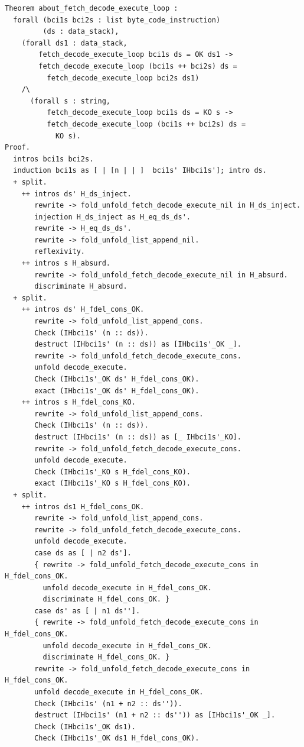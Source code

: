 \documentclass{article}
\begin{document}
\begin{lstlisting}
Theorem about_fetch_decode_execute_loop :
  forall (bci1s bci2s : list byte_code_instruction)
         (ds : data_stack),
    (forall ds1 : data_stack,
        fetch_decode_execute_loop bci1s ds = OK ds1 ->
        fetch_decode_execute_loop (bci1s ++ bci2s) ds =
          fetch_decode_execute_loop bci2s ds1)
    /\
      (forall s : string,
          fetch_decode_execute_loop bci1s ds = KO s ->
          fetch_decode_execute_loop (bci1s ++ bci2s) ds =
            KO s).
Proof.
  intros bci1s bci2s.
  induction bci1s as [ | [n | | ]  bci1s' IHbci1s']; intro ds.
  + split.
    ++ intros ds' H_ds_inject.
       rewrite -> fold_unfold_fetch_decode_execute_nil in H_ds_inject.
       injection H_ds_inject as H_eq_ds_ds'.
       rewrite -> H_eq_ds_ds'.
       rewrite -> fold_unfold_list_append_nil.
       reflexivity.
    ++ intros s H_absurd.
       rewrite -> fold_unfold_fetch_decode_execute_nil in H_absurd.
       discriminate H_absurd.
  + split.
    ++ intros ds' H_fdel_cons_OK.
       rewrite -> fold_unfold_list_append_cons.
       Check (IHbci1s' (n :: ds)).
       destruct (IHbci1s' (n :: ds)) as [IHbci1s'_OK _].
       rewrite -> fold_unfold_fetch_decode_execute_cons.
       unfold decode_execute.
       Check (IHbci1s'_OK ds' H_fdel_cons_OK).
       exact (IHbci1s'_OK ds' H_fdel_cons_OK).
    ++ intros s H_fdel_cons_KO.
       rewrite -> fold_unfold_list_append_cons.
       Check (IHbci1s' (n :: ds)).
       destruct (IHbci1s' (n :: ds)) as [_ IHbci1s'_KO].
       rewrite -> fold_unfold_fetch_decode_execute_cons.
       unfold decode_execute.
       Check (IHbci1s'_KO s H_fdel_cons_KO).
       exact (IHbci1s'_KO s H_fdel_cons_KO).
  + split.
    ++ intros ds1 H_fdel_cons_OK.
       rewrite -> fold_unfold_list_append_cons.
       rewrite -> fold_unfold_fetch_decode_execute_cons.
       unfold decode_execute.
       case ds as [ | n2 ds'].
       { rewrite -> fold_unfold_fetch_decode_execute_cons in H_fdel_cons_OK.
         unfold decode_execute in H_fdel_cons_OK.
         discriminate H_fdel_cons_OK. }
       case ds' as [ | n1 ds''].
       { rewrite -> fold_unfold_fetch_decode_execute_cons in H_fdel_cons_OK.
         unfold decode_execute in H_fdel_cons_OK.
         discriminate H_fdel_cons_OK. }
       rewrite -> fold_unfold_fetch_decode_execute_cons in H_fdel_cons_OK.
       unfold decode_execute in H_fdel_cons_OK.
       Check (IHbci1s' (n1 + n2 :: ds'')).
       destruct (IHbci1s' (n1 + n2 :: ds'')) as [IHbci1s'_OK _].
       Check (IHbci1s'_OK ds1).
       Check (IHbci1s'_OK ds1 H_fdel_cons_OK).

\end{lstlisting}
\end{document}
